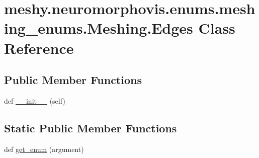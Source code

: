 \hypertarget{classmeshy_1_1neuromorphovis_1_1enums_1_1meshing__enums_1_1Meshing_1_1Edges}{}\section{meshy.\+neuromorphovis.\+enums.\+meshing\+\_\+enums.\+Meshing.\+Edges Class Reference}
\label{classmeshy_1_1neuromorphovis_1_1enums_1_1meshing__enums_1_1Meshing_1_1Edges}


 


\subsection*{Public Member Functions}
\begin{DoxyCompactItemize}
\item 
def \hyperlink{classmeshy_1_1neuromorphovis_1_1enums_1_1meshing__enums_1_1Meshing_1_1Edges_a12d21dbb0bcbd61273446bc94b133c22}{\+\_\+\+\_\+init\+\_\+\+\_\+} (self)\hypertarget{classmeshy_1_1neuromorphovis_1_1enums_1_1meshing__enums_1_1Meshing_1_1Edges_a12d21dbb0bcbd61273446bc94b133c22}{}\label{classmeshy_1_1neuromorphovis_1_1enums_1_1meshing__enums_1_1Meshing_1_1Edges_a12d21dbb0bcbd61273446bc94b133c22}

\end{DoxyCompactItemize}
\subsection*{Static Public Member Functions}
\begin{DoxyCompactItemize}
\item 
def \hyperlink{classmeshy_1_1neuromorphovis_1_1enums_1_1meshing__enums_1_1Meshing_1_1Edges_afb8528077844c254c010bcc41655e3e8}{get\+\_\+enum} (argument)\hypertarget{classmeshy_1_1neuromorphovis_1_1enums_1_1meshing__enums_1_1Meshing_1_1Edges_afb8528077844c254c010bcc41655e3e8}{}\label{classmeshy_1_1neuromorphovis_1_1enums_1_1meshing__enums_1_1Meshing_1_1Edges_afb8528077844c254c010bcc41655e3e8}

\end{DoxyCompactItemize}
